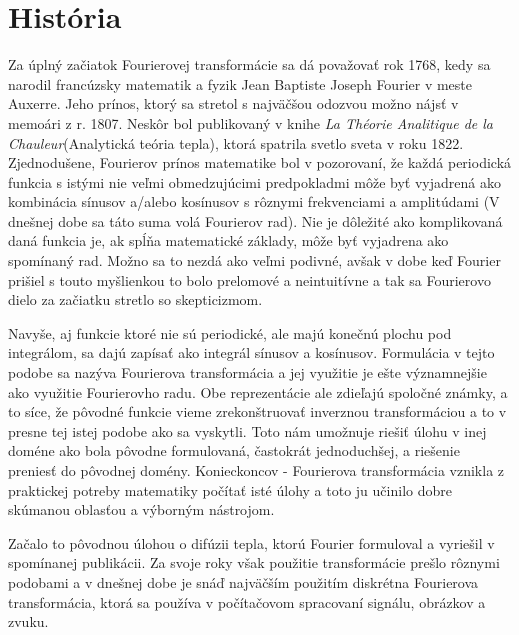 \section{História}
Za úplný začiatok Fourierovej transformácie sa dá považovať rok 1768,
kedy sa narodil francúzsky matematik a fyzik Jean Baptiste Joseph
Fourier v meste Auxerre. Jeho prínos, ktorý sa stretol s najväčšou
odozvou možno nájsť v memoári z r. 1807. Neskôr bol publikovaný v
knihe \emph{La Théorie Analitique de la Chauleur}(Analytická teória
tepla), ktorá spatrila svetlo sveta v roku 1822.
Zjednodušene, Fourierov prínos matematike bol v pozorovaní, že každá
periodická funkcia s istými nie veľmi obmedzujúcimi predpokladmi
môže byť vyjadrená ako kombinácia sínusov a/alebo kosínusov s rôznymi
frekvenciami a amplitúdami (V dnešnej dobe sa táto suma volá Fourierov
rad). Nie je dôležité ako komplikovaná daná funkcia je, ak spĺňa
matematické základy, môže byť vyjadrena ako spomínaný rad. Možno sa to
nezdá ako veľmi podivné, avšak v dobe keď Fourier prišiel s touto
myšlienkou to bolo prelomové a neintuitívne a tak sa Fourierovo dielo
za začiatku stretlo so skepticizmom.

Navyše, aj funkcie ktoré nie sú periodické, ale majú konečnú plochu
pod integrálom, sa dajú zapísať ako integrál sínusov a kosínusov.
Formulácia v tejto podobe sa nazýva Fourierova transformácia a jej
využitie je ešte významnejšie ako využitie Fourierovho radu. Obe
reprezentácie ale zdieľajú spoločné známky, a to síce, že pôvodné
funkcie vieme zrekonštruovať inverznou transformáciou a to v presne
tej istej podobe ako sa vyskytli. Toto nám umožnuje riešiť úlohu v
inej doméne ako bola pôvodne formulovaná, častokrát jednoduchšej, a
riešenie preniesť do pôvodnej domény. Konieckoncov - Fourierova
transformácia vznikla z praktickej potreby matematiky počítať isté
úlohy a toto ju učinilo dobre skúmanou oblasťou a výborným nástrojom.

Začalo to pôvodnou úlohou o difúzii tepla, ktorú Fourier formuloval a
vyriešil v spomínanej publikácii. Za svoje roky však použitie
transformácie prešlo rôznymi podobami a v dnešnej dobe je snáď
najväčším použitím diskrétna Fourierova transformácia, ktorá sa
používa v počítačovom spracovaní signálu, obrázkov a zvuku.
